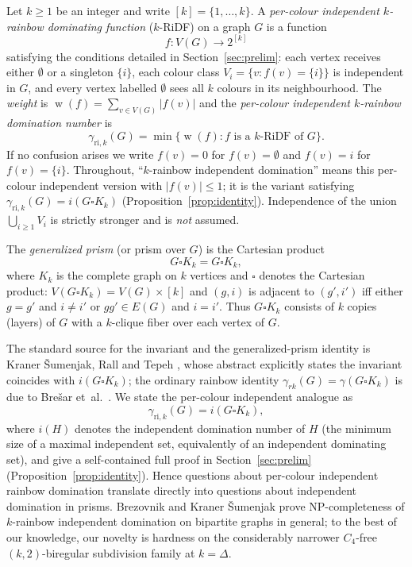 \documentclass[11pt,a4paper]{article}
\theoremstyle{plain}
\theoremstyle{definition}
\DeclareMathOperator{\weight}{w}
\newcommand{\gri}{\gamma_{\mathrm{ri},k}}
\newcommand{\cardK}{\square K_k}
\newcommand{\prism}[1]{#1 \cardK}
\newcommand{\setK}{[k]}
\begin{document}
Let $k\ge 1$ be an integer and write $\setK=\{1,\dots,k\}$.
A \emph{per-colour independent $k$-rainbow dominating function} ($k$-RiDF) on a graph $G$
is a function
\[
f\colon V(G)\to 2^{\setK}
\]
satisfying the conditions detailed in Section~\ref{sec:prelim}:
each vertex receives either $\emptyset$ or a singleton $\{i\}$,
each colour class $V_{i}=\{v:f(v)=\{i\}\}$ is independent in $G$,
and every vertex labelled $\emptyset$ sees all $k$ colours in its neighbourhood.
The \emph{weight} is $\weight(f)=\sum_{v\in V(G)}|f(v)|$
and the \emph{per-colour independent $k$-rainbow domination number} is
\[
\gri(G)=\min\{\weight(f): f\text{ is a $k$-RiDF of }G\}.
\]
If no confusion arises we write $f(v)=0$ for $f(v)=\emptyset$ and $f(v)=i$ for $f(v)=\{i\}$.
Throughout, ``$k$-rainbow independent domination'' means this per-colour independent version with $|f(v)|\le 1$; it is the variant satisfying $\gri(G)=i(G\cardK)$ (Proposition~\ref{prop:identity}). Independence of the union $\bigcup_{i\ge1}V_{i}$ is strictly stronger and is \emph{not} assumed.

The \emph{generalized prism} (or prism over $G$) is the Cartesian product
\[
\prism{G}=G\square K_{k},
\]
where $K_{k}$ is the complete graph on $k$ vertices and $\square$ denotes the Cartesian product:
$V(G\square K_{k})=V(G)\times\setK$ and $(g,i)$ is adjacent to $(g',i')$ iff
either $g=g'$ and $i\neq i'$ or $gg'\in E(G)$ and $i=i'$.
Thus $\prism{G}$ consists of $k$ copies (layers) of $G$ with a $k$-clique fiber over each
vertex of $G$.

The standard source for the invariant and the generalized-prism identity is Kraner \v{S}umenjak, Rall and Tepeh \cite{KST2018}, whose abstract explicitly states the invariant coincides with $i(G\square K_{k})$; the ordinary rainbow identity $\gamma_{rk}(G)=\gamma(G\cardK)$ is due to Bre\v{s}ar et~al.\ \cite{BresarSum2007}. We state the per-colour independent analogue as
\begin{equation}\label{eq:identity}
\gri(G)=i(G\cardK),
\end{equation}
where $i(H)$ denotes the independent domination number of $H$ (the minimum size of a maximal independent set, equivalently of an independent dominating set),
and give a self-contained full proof in Section~\ref{sec:prelim} (Proposition~\ref{prop:identity}). Hence questions about per-colour independent rainbow domination translate directly into questions about independent domination in prisms. Brezovnik and Kraner \v{S}umenjak \cite{BK2019} prove NP-completeness of $k$-rainbow independent domination on bipartite graphs in general; to the best of our knowledge, our novelty is hardness on the considerably narrower $C_{4}$-free $(k,2)$-biregular subdivision family at $k=\Delta$.
\end{document}
